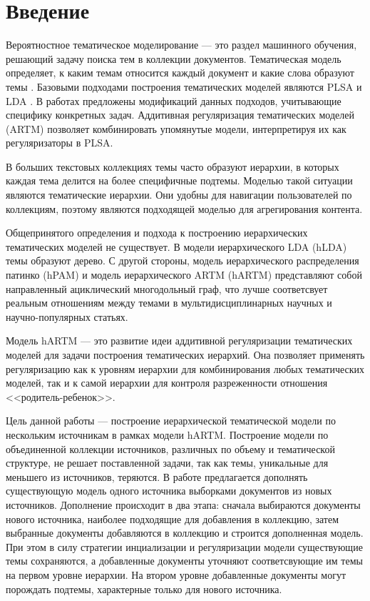 \chapter{Введение}
Вероятностное тематическое моделирование --- это  раздел машинного обучения, решающий задачу поиска тем в коллекции документов. Тематическая модель определяет, к каким темам относится каждый документ и какие слова образуют темы \cite{Blei2012}. Базовыми подходами построения тематических моделей являются PLSA \cite{PLSA} и LDA \cite{LDA}. В работах \cite{Chemudugunta2006, Rosen-Zvi2004, Than2012} предложены модификаций данных подходов, учитывающие специфику конкретных задач. Аддитивная регуляризация тематических
моделей (ARTM)\cite{ARTM1, ARTM2, ARTM3, ARTM4, Vorontsov2014} позволяет комбинировать упомянутые модели, интерпретируя их как регуляризаторы в PLSA. 


В больших текстовых коллекциях темы часто образуют иерархии, в которых каждая тема делится на более специфичные подтемы. Моделью такой ситуации являются тематические иерархии. Они удобны для навигации пользователей по коллекциям, поэтому являются подходящей моделью для агрегирования контента.

Общепринятого определения и подхода к построению иерархических тематических моделей не существует. В модели иерархического LDA (hLDA) \cite{hLDA} темы образуют дерево. С другой стороны, модель иерархического распределения патинко (hPAM)\cite{hPAM} и модель иерархического ARTM (hARTM) \cite{hARTM} представляют собой направленный ациклический многодольный граф, что лучше соответсвует реальным отношениям между темами в мультидисциплинарных научных и научно-популярных статьях.

Модель hARTM --- это развитие идеи аддитивной регуляризации тематических моделей для задачи построения тематических иерархий.
Она позволяет применять регуляризацию как к уровням иерархии для комбинирования любых тематических моделей, так и к самой иерархии для контроля разреженности отношения <<родитель-ребенок>>.

Цель данной работы --- построение иерархической тематической модели по нескольким источникам в рамках модели hARTM. Построение модели по объединенной коллекции источников, различных по объему и тематической структуре, не решает поставленной задачи, так как темы, уникальные для меньшего из источников, теряются. В работе предлагается дополнять существующую модель одного источника выборками документов из новых источников. Дополнение происходит в два этапа: сначала выбираются документы нового источника, наиболее подходящие для добавления в коллекцию, затем выбранные документы добавляются в коллекцию и строится дополненная модель. При этом в силу стратегии инциализации и регуляризации модели существующие темы сохраняются, а добавленные документы уточняют соответсвующие им темы на первом уровне иерархии. На втором уровне добавленные документы могут порождать подтемы, характерные только для нового источника. 

